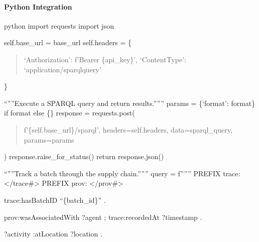 \documentclass[letterpaper,10pt,english]{sphinxmanual}
\begin{document}
\paragraph{Python Integration}
\label{\detokenize{api/sparql-api:python-integration}}
\sphinxAtStartPar
{\color{red}\bfseries{}\textasciigrave{}\textasciigrave{}}{\color{red}\bfseries{}\textasciigrave{}}python
import requests
import json
\begin{description}
\begin{description}
\sphinxAtStartPar
self.base\_url = base\_url
self.headers = \{
\begin{quote}

\sphinxAtStartPar
‘Authorization’: f’Bearer \{api\_key\}’,
‘Content\sphinxhyphen{}Type’: ‘application/sparql\sphinxhyphen{}query’
\end{quote}

\sphinxAtStartPar
\}

\sphinxAtStartPar
“””Execute a SPARQL query and return results.”””
params = \{‘format’: format\} if format else \{\}
response = requests.post(
\begin{quote}

\sphinxAtStartPar
f’\{self.base\_url\}/sparql’,
headers=self.headers,
data=sparql\_query,
params=params
\end{quote}

\sphinxAtStartPar
)
response.raise\_for\_status()
return response.json()

\sphinxAtStartPar
“””Track a batch through the supply chain.”””
query = f”””
PREFIX trace: \textless{}/trace\#\textgreater{}
PREFIX prov: \textless{}/prov\#\textgreater{}
\begin{description}
\begin{description}
\sphinxAtStartPar
trace:hasBatchID “\{batch\_id\}” .

\sphinxAtStartPar
prov:wasAssociatedWith ?agent ;
trace:recordedAt ?timestamp .

\sphinxAtStartPar
?activity :atLocation ?location .

\end{description}


\end{description}
\end{description}
\end{description}
\end{document}
